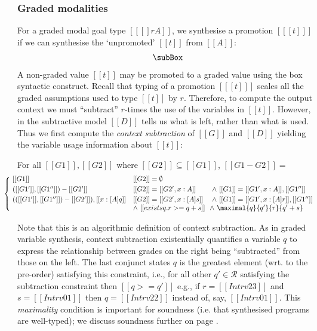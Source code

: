   \subsubsection{Graded modalities}
  For a graded modal goal type $[[ [] r A ]]$, we synthesise a promotion
$[[ [ t ] ]]$ if we can synthesise the `unpromoted' $[[t]]$ from $[[A]]$:
  \begin{align*}
    \subBox
    \end{align*}
%
  A non-graded value $[[t]]$ may be promoted to a graded value using
  the box syntactic construct.
  Recall that typing of a promotion $[[ [ t ] ]]$
  scales all the graded assumptions used to type $[[ t ]]$ by $r$. Therefore,
  to compute the output context we must ``subtract'' $r$-times the use of the variables in $[[
  t ]]$. However, in the subtractive model $[[ D ]]$ tells us what is
  left, rather than what is used. Thus we first compute the
  \textit{context subtraction} of $[[G]]$ and $[[D]]$
  yielding the variable usage information about $[[ t ]]$:
  \begin{definition}\label{def:contextSub}
  For all $[[ G1 ]], [[ G2 ]]$ where $ [[G2]] \subseteq [[G1]]$, $[[G1 - G2]] =$
\begin{align*}
\hspace{-2em}\left\{\!\begin{matrix}
\begin{array}{lll}
[[G1]]
  & [[G2]] = \emptyset
\\[0.25em]
([[G1']], [[G1'']]) - [[G2']]
  & [[G2]] = [[ G2', x : A]] & \wedge\ [[G1]] = [[G1', x : A]], [[G1'']]
\\[0.25em]
(([[G1']], [[G1'']]) - [[G2']]), [[x : [A] q]]
  & [[ G2]] = [[G2', x : [A] s]] & \wedge\ [[G1]] = [[ G1',x : [A]
                                   r]],[[G1'']] \\[0em]
          & \wedge \ [[ exists q . r >= q + s]]
          & \!\! \wedge \ \maximal{q}{q'}{r}{q' + s}
\end{array}
\end{matrix}\right.
\end{align*}
%
\end{definition}
Note that this is an algorithmic definition of context subtraction. As in graded
variable synthesis, context subtraction existentially quantifies a variable $q$
to express the relationship between grades on the right being ``subtracted''
from those on the left. The last conjunct states $q$ is the greatest element
(wrt. to the pre-order) satisfying this constraint, i.e., for all other $q' \in
\mathcal{R}$ satisfying the subtraction constraint then $[[ q >= q']]$ e.g., if
$r = [[ Intrv 2 3 ]]$ and $s = [[ Intrv 0 1]]$ then $q = [[ Intrv 2 2 ]]$
instead of, say, $[[ Intrv 0 1]]$. This \emph{maximality} condition is important
for soundness (i.e. that synthesised programs are well-typed); we discuss soundness further on page \pageref{soundness-ref}.

